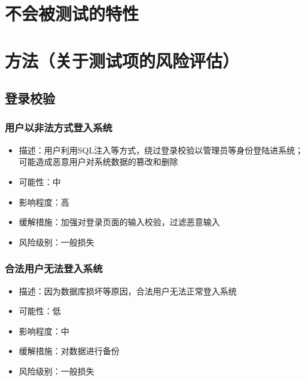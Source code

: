 \documentclass[hyperref, a4paper]{ctexart}
\providecommand{\tightlist}{%
  \setlength{\itemsep}{0pt}\setlength{\parskip}{0pt}}
\begin{document}
\hypertarget{ux4e0dux4f1aux88abux6d4bux8bd5ux7684ux7279ux6027}{%
\section{不会被测试的特性}\label{ux4e0dux4f1aux88abux6d4bux8bd5ux7684ux7279ux6027}}

\hypertarget{ux65b9ux6cd5ux5173ux4e8eux6d4bux8bd5ux9879ux7684ux98ceux9669ux8bc4ux4f30}{%
\section{方法（关于测试项的风险评估）}\label{ux65b9ux6cd5ux5173ux4e8eux6d4bux8bd5ux9879ux7684ux98ceux9669ux8bc4ux4f30}}

\hypertarget{ux767bux5f55ux6821ux9a8c}{%
\subsection{登录校验}\label{ux767bux5f55ux6821ux9a8c}}

\hypertarget{ux7528ux6237ux4ee5ux975eux6cd5ux65b9ux5f0fux767bux5165ux7cfbux7edf}{%
\subsubsection{用户以非法方式登入系统}\label{ux7528ux6237ux4ee5ux975eux6cd5ux65b9ux5f0fux767bux5165ux7cfbux7edf}}

\begin{itemize}
\tightlist
\item
  描述：用户利用SQL注入等方式，绕过登录校验以管理员等身份登陆进系统；可能造成恶意用户对系统数据的篡改和删除
\item
  可能性：中
\item
  影响程度：高
\item
  缓解措施：加强对登录页面的输入校验，过滤恶意输入
\item
  风险级别：一般损失
\end{itemize}

\hypertarget{ux5408ux6cd5ux7528ux6237ux65e0ux6cd5ux767bux5165ux7cfbux7edf}{%
\subsubsection{合法用户无法登入系统}\label{ux5408ux6cd5ux7528ux6237ux65e0ux6cd5ux767bux5165ux7cfbux7edf}}

\begin{itemize}
\tightlist
\item
  描述：因为数据库损坏等原因，合法用户无法正常登入系统
\item
  可能性：低
\item
  影响程度：中
\item
  缓解措施：对数据进行备份
\item
  风险级别：一般损失
\end{itemize}
\end{document}

